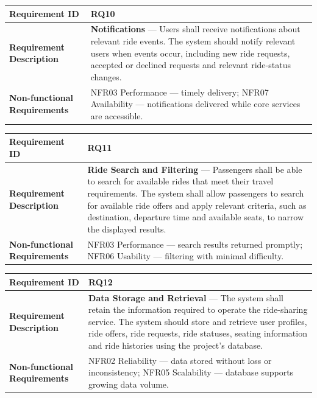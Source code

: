 \begin{minipage}{\textwidth}
\small
\begin{tabular}{|>{\raggedright\arraybackslash}p{}|>{\raggedright\arraybackslash}p{}|}
\hline
\textbf{Requirement ID} & RQ10 \\
\hline
\textbf{Requirement Description} & \textbf{Notifications} --- Users shall receive notifications about relevant ride events. The system should notify relevant users when events occur, including new ride requests, accepted or declined requests and relevant ride-status changes. \\
\hline
\textbf{Non-functional Requirements} & NFR03 Performance --- timely delivery; \newline NFR07 Availability --- notifications delivered while core services are accessible. \\
\hline
\end{tabular}
\end{minipage}
\medskip
 
\begin{minipage}{\textwidth}
\small
\begin{tabular}{|>{\raggedright\arraybackslash}p{}|>{\raggedright\arraybackslash}p{}|}
\hline
\textbf{Requirement ID} & RQ11 \\
\hline
\textbf{Requirement Description} & \textbf{Ride Search and Filtering} --- Passengers shall be able to search for available rides that meet their travel requirements. The system shall allow passengers to search for available ride offers and apply relevant criteria, such as destination, departure time and available seats, to narrow the displayed results. \\
\hline
\textbf{Non-functional Requirements} & NFR03 Performance --- search results returned promptly; \newline NFR06 Usability --- filtering with minimal difficulty. \\
\hline
\end{tabular}
\end{minipage}
\medskip
 
\begin{minipage}{\textwidth}
\small
\begin{tabular}{|>{\raggedright\arraybackslash}p{}|>{\raggedright\arraybackslash}p{}|}
\hline
\textbf{Requirement ID} & RQ12 \\
\hline
\textbf{Requirement Description} & \textbf{Data Storage and Retrieval} --- The system shall retain the information required to operate the ride-sharing service. The system should store and retrieve user profiles, ride offers, ride requests, ride statuses, seating information and ride histories using the project's database. \\
\hline
\textbf{Non-functional Requirements} & NFR02 Reliability --- data stored without loss or inconsistency; \newline NFR05 Scalability --- database supports growing data volume. \\
\hline
\end{tabular}
\end{minipage}
\medskip
 
